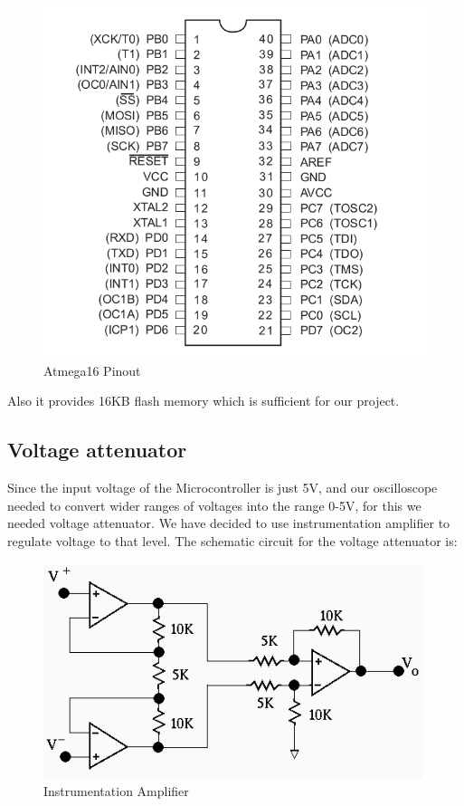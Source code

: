 \documentclass[12pt,a4paper]{article}
\begin{document}
		\begin{figure}[h]	
			\centering
			\includegraphics[scale=.35]{Images/Atmega16PinOut.png}
			\caption{Atmega16 Pinout}
			\label{fig:PinOut}
		\end{figure}

Also it provides 16KB flash memory which is sufficient for our project.



\subsection{Voltage attenuator}
Since the input voltage of the Microcontroller is just 5V, and our oscilloscope needed to convert wider ranges of voltages into the range 0-5V, for this we needed voltage attenuator. We have decided to use instrumentation amplifier to regulate voltage to that level. The schematic circuit for the voltage attenuator is:
\begin{figure}[hbtp]
	\centering
	\includegraphics[scale=.4]{./Images/Amplifier.png}
	\caption{Instrumentation Amplifier}
\end{figure}
\end{document}
